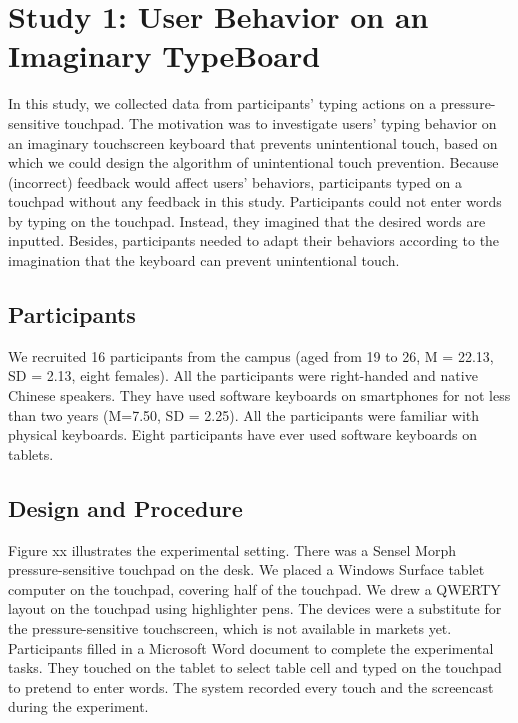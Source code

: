 \section{Study 1: User Behavior on an Imaginary TypeBoard}

In this study, we collected data from participants' typing actions on a pressure-sensitive touchpad. The motivation was to investigate users' typing behavior on an imaginary touchscreen keyboard that prevents unintentional touch, based on which we could design the algorithm of unintentional touch prevention. Because (incorrect) feedback would affect users' behaviors, participants typed on a touchpad without any feedback in this study. Participants could not enter words by typing on the touchpad. Instead, they imagined that the desired words are inputted. Besides, participants needed to adapt their behaviors according to the imagination that the keyboard can prevent unintentional touch.


\subsection{Participants}

We recruited 16 participants from the campus (aged from 19 to 26, M = 22.13, SD = 2.13, eight females). All the participants were right-handed and native Chinese speakers. They have used software keyboards on smartphones for not less than two years (M=7.50, SD = 2.25). All the participants were familiar with physical keyboards. Eight participants have ever used software keyboards on tablets.

\subsection{Design and Procedure}

Figure xx illustrates the experimental setting. There was a Sensel Morph \cite{Website-Morph} pressure-sensitive touchpad on the desk. We placed a Windows Surface tablet computer on the touchpad, covering half of the touchpad. We drew a QWERTY layout on the touchpad using highlighter pens. The devices were a substitute for the pressure-sensitive touchscreen, which is not available in markets yet. Participants filled in a Microsoft Word document to complete the experimental tasks. They touched on the tablet to select table cell and typed on the touchpad to pretend to enter words. The system recorded every touch and the screencast during the experiment.

